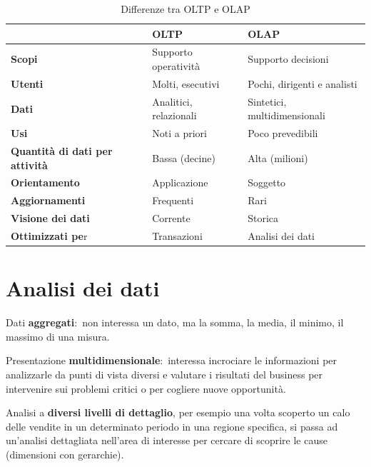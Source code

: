 \begin{table}[H]
	\centering
	\begin{tabular}{|m{8em}|l|l|}
		\hline
		                                       & \textbf{OLTP}          & \textbf{OLAP}                \\\hline
		\textbf{Scopi}                         & Supporto operatività   & Supporto decisioni           \\\hline
		\textbf{Utenti}                        & Molti, esecutivi       & Pochi, dirigenti e analisti  \\\hline
		\textbf{Dati}                          & Analitici, relazionali & Sintetici, multidimensionali \\\hline
		\textbf{Usi}                           & Noti a priori          & Poco prevedibili             \\\hline
		\textbf{Quantità di dati per attività} & Bassa (decine)         & Alta (milioni)               \\\hline
		\textbf{Orientamento}                  & Applicazione           & Soggetto                     \\\hline
		\textbf{Aggiornamenti}                 & Frequenti              & Rari                         \\\hline
		\textbf{Visione dei dati}              & Corrente               & Storica                      \\\hline
		\textbf{Ottimizzati pe}r               & Transazioni            & Analisi dei dati             \\\hline
	\end{tabular}
	\caption*{Differenze tra OLTP e OLAP}
\end{table}

\section{Analisi dei dati}

Dati \textbf{aggregati}:\ non interessa un dato, ma la somma, la media, il minimo, il massimo di una misura.

Presentazione \textbf{multidimensionale}:\ interessa incrociare le informazioni per analizzarle da punti di vista diversi e valutare i risultati del business per intervenire sui problemi critici o per cogliere nuove opportunità.

Analisi a \textbf{diversi livelli di dettaglio}, per esempio una volta scoperto un calo delle vendite in un determinato periodo in una regione specifica, si passa ad un'analisi dettagliata nell'area di interesse per cercare di scoprire le cause (dimensioni con gerarchie).


